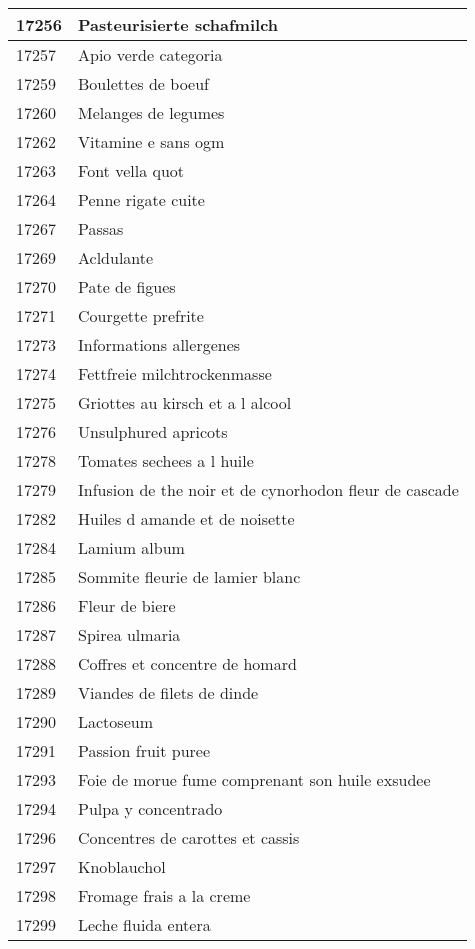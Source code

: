\begin{longtable}{|l|l|}
17256 & Pasteurisierte schafmilch \\ \hline 
17257 & Apio verde categoria \\ \hline 
17259 & Boulettes de boeuf \\ \hline 
17260 & Melanges de legumes \\ \hline 
17262 & Vitamine e sans ogm \\ \hline 
17263 & Font vella quot \\ \hline 
17264 & Penne rigate cuite \\ \hline 
17267 & Passas \\ \hline 
17269 & Acldulante \\ \hline 
17270 & Pate de figues \\ \hline 
17271 & Courgette prefrite \\ \hline 
17273 & Informations allergenes \\ \hline 
17274 & Fettfreie milchtrockenmasse \\ \hline 
17275 & Griottes au kirsch et a l alcool \\ \hline 
17276 & Unsulphured apricots \\ \hline 
17278 & Tomates sechees a l huile \\ \hline 
17279 & Infusion de the noir et de cynorhodon fleur de cascade \\ \hline 
17282 & Huiles d amande et de noisette \\ \hline 
17284 & Lamium album \\ \hline 
17285 & Sommite fleurie de lamier blanc \\ \hline 
17286 & Fleur de biere \\ \hline 
17287 & Spirea ulmaria \\ \hline 
17288 & Coffres et concentre de homard \\ \hline 
17289 & Viandes de filets de dinde \\ \hline 
17290 & Lactoseum \\ \hline 
17291 & Passion fruit puree \\ \hline 
17293 & Foie de morue fume comprenant son huile exsudee \\ \hline 
17294 & Pulpa y concentrado \\ \hline 
17296 & Concentres de carottes et cassis \\ \hline 
17297 & Knoblauchol \\ \hline 
17298 & Fromage frais a la creme \\ \hline 
17299 & Leche fluida entera \\ \hline 

\end{longtable}
